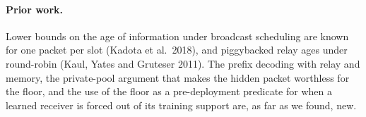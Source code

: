 \paragraph{Prior work.} Lower bounds on the age of information under broadcast scheduling are known for one packet per
slot (Kadota et al.\ 2018), and piggybacked relay ages under round-robin (Kaul, Yates and Gruteser 2011). The prefix
decoding with relay and memory, the private-pool argument that makes the hidden packet worthless for the floor, and the
use of the floor as a pre-deployment predicate for when a learned receiver is forced out of its training support are,
as far as we found, new.
